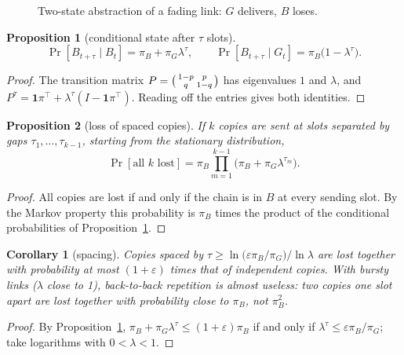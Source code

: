 \documentclass[11pt,a4paper]{article}
\newtheorem{proposition}{Proposition}
\newtheorem{corollary}{Corollary}
\theoremstyle{definition}
\begin{document}
\begin{figure}[h]\centering
{}
\caption{Two-state abstraction of a fading link: $G$ delivers, $B$ loses.}
\end{figure}

\begin{proposition}[conditional state after $\tau$ slots]\label{prop:cond}
\[
\Pr[B_{t+\tau}\mid B_t]=\pi_B+\pi_G\lambda^\tau,\qquad \Pr[B_{t+\tau}\mid G_t]=\pi_B\big(1-\lambda^\tau\big).
\]
\end{proposition}
\begin{proof}
The transition matrix $P=\begin{psmallmatrix}1-p&p\\q&1-q\end{psmallmatrix}$ has eigenvalues $1$ and $\lambda$, and $P^\tau=\mathbf 1\pi^\top+\lambda^\tau(I-\mathbf 1\pi^\top)$. Reading off the entries gives both identities.
\end{proof}

\begin{proposition}[loss of spaced copies]\label{prop:allLost}
If $k$ copies are sent at slots separated by gaps $\tau_1,\dots,\tau_{k-1}$, starting from the stationary distribution,
\[
\Pr[\text{all }k\text{ lost}]=\pi_B\prod_{m=1}^{k-1}\big(\pi_B+\pi_G\lambda^{\tau_m}\big).
\]
\end{proposition}
\begin{proof}
All copies are lost if and only if the chain is in $B$ at every sending slot. By the Markov property this probability is $\pi_B$ times the product of the conditional probabilities of Proposition~\ref{prop:cond}.
\end{proof}

\begin{corollary}[spacing]\label{cor:spacing}
Copies spaced by $\tau\ge\ln\!\big(\varepsilon\pi_B/\pi_G\big)/\ln\lambda$ are lost together with probability at most $(1+\varepsilon)$ times that of independent copies. With bursty links ($\lambda$ close to 1), back-to-back repetition is almost useless: two copies one slot apart are lost together with probability close to $\pi_B$, not $\pi_B^2$.
\end{corollary}
\begin{proof}
By Proposition~\ref{prop:cond}, $\pi_B+\pi_G\lambda^\tau\le(1+\varepsilon)\pi_B$ if and only if $\lambda^\tau\le\varepsilon\pi_B/\pi_G$; take logarithms with $0<\lambda<1$.
\end{proof}
\end{document}
